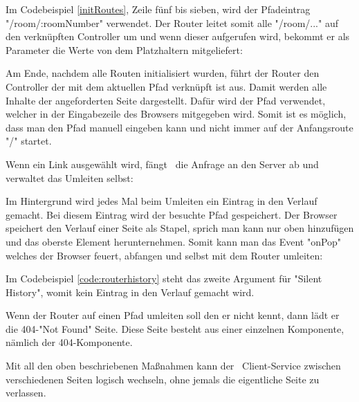 Im Codebeispiel \ref{initRoutes}, Zeile fünf bis sieben, wird der Pfadeintrag "{\ttfamily /room/:roomNumber}" verwendet. Der Router leitet somit alle "{\ttfamily /room/...}" auf den verknüpften Controller um und wenn dieser aufgerufen wird, bekommt er als Parameter die Werte von dem Platzhaltern mitgeliefert:


Am Ende, nachdem alle Routen initialisiert wurden, führt der Router den Controller der mit dem aktuellen Pfad verknüpft ist aus. Damit werden alle  Inhalte der angeforderten Seite dargestellt. Dafür wird der Pfad verwendet, welcher in der Eingabezeile des Browsers mitgegeben wird. Somit ist es möglich, dass man den Pfad manuell eingeben kann und nicht immer auf der Anfangsroute "{\ttfamily /}" startet.

Wenn ein Link ausgewählt wird, fängt \ZELIA\ die Anfrage an den Server ab und verwaltet das Umleiten selbst:


Im  Hintergrund wird jedes Mal beim Umleiten ein Eintrag in den Verlauf gemacht. Bei diesem Eintrag wird der besuchte Pfad gespeichert. Der Browser speichert den Verlauf einer Seite als Stapel, sprich man kann nur oben hinzufügen und das oberste Element herunternehmen. Somit kann man das Event "onPop" welches der Browser feuert, abfangen und selbst mit dem Router umleiten:


Im Codebeispiel \ref{code:routerhistory} steht das zweite Argument für "Silent History", womit kein Eintrag in den Verlauf gemacht wird.

Wenn der Router auf einen Pfad umleiten soll den er nicht kennt, dann lädt er die 404-"Not Found" Seite. Diese Seite besteht aus einer einzelnen Komponente, nämlich der 404-Komponente.


Mit all den oben beschriebenen Maßnahmen kann der \ZELIA\ Client-Service zwischen verschiedenen Seiten logisch wechseln, ohne jemals die eigentliche Seite zu verlassen.
